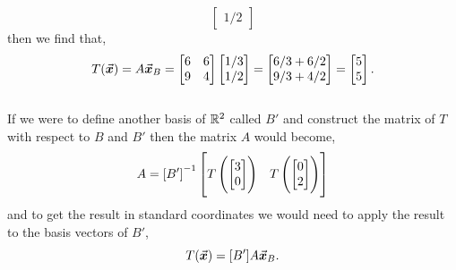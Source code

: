 \documentclass[MathsNotesBase.tex]{subfiles}
\begin{document}
{\begin{exe}
{\[\begin{bmatrix}
													1/2
													\end{bmatrix}									
				\]
				then we find that,
				\[ T(\vec{\bm{x}}) = A\vec{\bm{x}}_B = \begin{bmatrix}
									6 & 6\\
									9 & 4
									\end{bmatrix}
									\begin{bmatrix}
									1/3\\
									1/2
									\end{bmatrix} =
									\begin{bmatrix}
									6/3 + 6/2\\
									9/3 + 4/2
									\end{bmatrix} =
									\begin{bmatrix}
									5\\
									5
									\end{bmatrix}.
				\]
				\\If we were to define another basis of $\mathbb{R}^{2}$ called $B'$ and construct the matrix of $T$ with respect to $B$ and $B'$ then the matrix $A$ would become,
				\[ A = {[B']}^{-1}\begin{bmatrix}
						T\left(\begin{bmatrix}3 \\ 0\end{bmatrix}\right) & T\left(\begin{bmatrix}0 \\ 2\end{bmatrix}\right)
						\end{bmatrix}
				\]
				and to get the result in standard coordinates we would need to apply the result to the basis vectors of $B'$,
				\[ T(\vec{\bm{x}}) = [B']A\vec{\bm{x}}_B. \]
				
}
\end{exe}}
\end{document}
